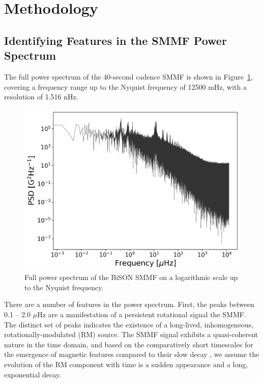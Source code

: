 \section{Methodology}\label{sec:SMMF_method}


\subsection{Identifying Features in the SMMF Power Spectrum}

The full power spectrum of the 40-second cadence SMMF is shown in Figure~\ref{fig:BiSON_FT_full}, covering a frequency range up to the Nyquist frequency of 12500 mHz, with a resolution of 1.516 nHz. 

\begin{figure}[ht!]
	\centering
	\includegraphics[width=\columnwidth]{BiSON_SMMF_FT_full.png}
	\caption{Full power spectrum of the BiSON SMMF on a logarithmic scale up to the Nyquist frequency.}
	\label{fig:BiSON_FT_full}
\end{figure}

There are a number of features in the power spectrum. First, the peaks between 0.1 -- 2.0 $\mu\mathrm{Hz}$ are a manifestation of a persistent rotational signal the SMMF. The distinct set of peaks indicates the existence of a long-lived, inhomogeneous, rotationally-modulated (RM) source. The SMMF signal exhibits a quasi-coherent nature in the time domain, and based on the comparatively short timescales for the emergence of magnetic features compared to their slow decay \citep{zwaan_solar_1981, harvey_properties_1993, hathaway_sunspot_2008}, we assume the evolution of the RM component with time is a sudden appearance and a long, exponential decay.

